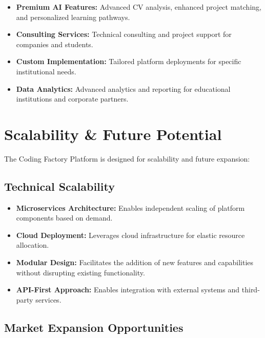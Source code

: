\documentclass[12pt,a4paper]{report}
\begin{document}
\begin{itemize}
    \item \textbf{Premium AI Features:} Advanced CV analysis, enhanced project matching, and personalized learning pathways.

    \item \textbf{Consulting Services:} Technical consulting and project support for companies and students.

    \item \textbf{Custom Implementation:} Tailored platform deployments for specific institutional needs.

    \item \textbf{Data Analytics:} Advanced analytics and reporting for educational institutions and corporate partners.
\end{itemize}

\section{Scalability \& Future Potential}

The Coding Factory Platform is designed for scalability and future expansion:

\subsection{Technical Scalability}

\begin{itemize}
    \item \textbf{Microservices Architecture:} Enables independent scaling of platform components based on demand.

    \item \textbf{Cloud Deployment:} Leverages cloud infrastructure for elastic resource allocation.

    \item \textbf{Modular Design:} Facilitates the addition of new features and capabilities without disrupting existing functionality.

    \item \textbf{API-First Approach:} Enables integration with external systems and third-party services.
\end{itemize}

\subsection{Market Expansion Opportunities}
\end{document}
